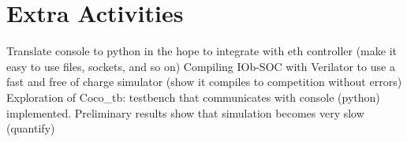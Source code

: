 \chapter{Extra Activities}
\label{chapter:extra activities}
\quad Translate console to python in the hope to integrate with eth controller (make it easy to use files, sockets, and so on)
\quad Compiling IOb-SOC with Verilator to use a fast and free of charge simulator (show it compiles to competition without errors)
\quad Exploration of Coco_tb: testbench that communicates with console (python) implemented. Preliminary results show that simulation becomes very slow (quantify)
